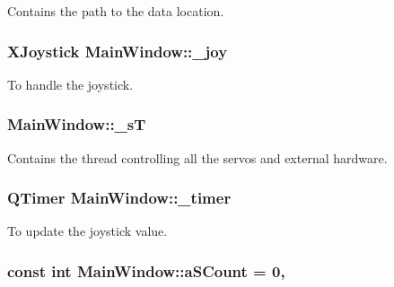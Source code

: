 Contains the path to the data location. 

\hypertarget{a00005_a671f35800890e518713e1946671d8730}{}
\subsubsection[{\+\_\+joy}]{\setlength{\rightskip}{0pt plus 5cm}X\+Joystick Main\+Window\+::\+\_\+joy\hspace{0.3cm}{\ttfamily [private]}}\label{a00005_a671f35800890e518713e1946671d8730}


To handle the joystick. 

\hypertarget{a00005_a97f8ecc7ecb930b796178cef7b975013}{}
\subsubsection[{\+\_\+s\+T}]{ Main\+Window\+::\+\_\+s\+T\hspace{0.3cm}{\ttfamily [private]}}\label{a00005_a97f8ecc7ecb930b796178cef7b975013}


Contains the thread controlling all the servos and external hardware. 

\hypertarget{a00005_a254b03b878cfda75c1c411a2f8568d33}{}
\subsubsection[{\+\_\+timer}]{\setlength{\rightskip}{0pt plus 5cm}Q\+Timer Main\+Window\+::\+\_\+timer\hspace{0.3cm}{\ttfamily [private]}}\label{a00005_a254b03b878cfda75c1c411a2f8568d33}


To update the joystick value. 

\hypertarget{a00005_a42c44af9c0eebc33f4e81f02e15b0461}{}
\subsubsection[{a\+S\+Count}]{\setlength{\rightskip}{0pt plus 5cm}const int Main\+Window\+::a\+S\+Count = 0\hspace{0.3cm}{\ttfamily [static]}, {\ttfamily [private]}}\label{a00005_a42c44af9c0eebc33f4e81f02e15b0461}


